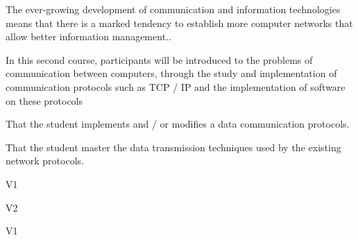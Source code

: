 \begin{syllabus}


\begin{justification}
The ever-growing development of communication and information technologies
means that there is a marked tendency to establish more computer networks that allow better information management..

In this second course, participants will be introduced to the problems of communication between computers,
through the study and implementation of communication protocols such as TCP / IP and the implementation of software on these protocols
\end{justification}

\begin{goals}
\item That the student implements and / or modifies a data communication protocols.
\item That the student master the data transmission techniques used by the existing network protocols.
\end{goals}

\begin{outcomes}{V1}
    \item {}
    \item {}
    \item {}
\end{outcomes}

\begin{outcomes}{V2}
    \item {}
    \item {}
    \item {}
\end{outcomes}

\begin{competences}{V1}
    \item {}
    \item {}
    \item {}
    \item {}
    \item {}
    \item {}
    \item {}
\end{competences}


\end{syllabus}

